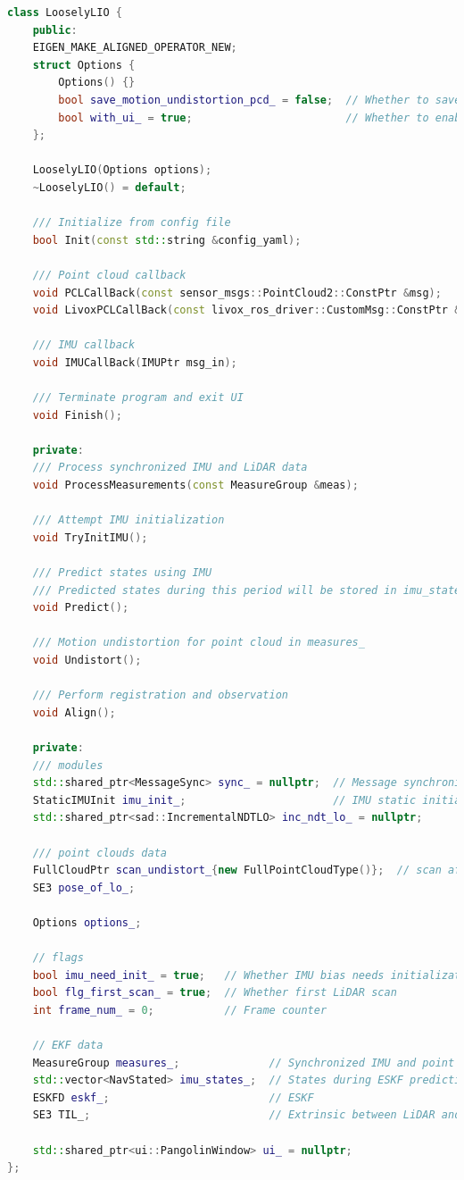 \begin{lstlisting}[language=c++,caption=src/ch7/loosely_coupled_lio/loosly_lio.h]
class LooselyLIO {
	public:
	EIGEN_MAKE_ALIGNED_OPERATOR_NEW;
	struct Options {
		Options() {}
		bool save_motion_undistortion_pcd_ = false;  // Whether to save point clouds before/after motion undistortion
		bool with_ui_ = true;                        // Whether to enable UI
	};
	
	LooselyLIO(Options options);
	~LooselyLIO() = default;
	
	/// Initialize from config file
	bool Init(const std::string &config_yaml);
	
	/// Point cloud callback
	void PCLCallBack(const sensor_msgs::PointCloud2::ConstPtr &msg);
	void LivoxPCLCallBack(const livox_ros_driver::CustomMsg::ConstPtr &msg);
	
	/// IMU callback
	void IMUCallBack(IMUPtr msg_in);
	
	/// Terminate program and exit UI
	void Finish();
	
	private:
	/// Process synchronized IMU and LiDAR data
	void ProcessMeasurements(const MeasureGroup &meas);
	
	/// Attempt IMU initialization
	void TryInitIMU();
	
	/// Predict states using IMU
	/// Predicted states during this period will be stored in imu_states_
	void Predict();
	
	/// Motion undistortion for point cloud in measures_
	void Undistort();
	
	/// Perform registration and observation
	void Align();
	
	private:
	/// modules
	std::shared_ptr<MessageSync> sync_ = nullptr;  // Message synchronizer
	StaticIMUInit imu_init_;                       // IMU static initialization
	std::shared_ptr<sad::IncrementalNDTLO> inc_ndt_lo_ = nullptr;
	
	/// point clouds data
	FullCloudPtr scan_undistort_{new FullPointCloudType()};  // scan after undistortion
	SE3 pose_of_lo_;
	
	Options options_;
	
	// flags
	bool imu_need_init_ = true;   // Whether IMU bias needs initialization
	bool flg_first_scan_ = true;  // Whether first LiDAR scan
	int frame_num_ = 0;           // Frame counter
	
	// EKF data
	MeasureGroup measures_;              // Synchronized IMU and point cloud
	std::vector<NavStated> imu_states_;  // States during ESKF prediction
	ESKFD eskf_;                         // ESKF
	SE3 TIL_;                            // Extrinsic between LiDAR and IMU
	
	std::shared_ptr<ui::PangolinWindow> ui_ = nullptr;
};
\end{lstlisting}

